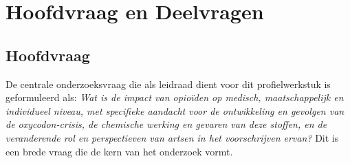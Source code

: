 \documentclass[11pt, a4paper]{report} %
\begin{document}
\section{Hoofdvraag en Deelvragen}
\subsection{Hoofdvraag}
De centrale onderzoeksvraag die als leidraad dient voor dit profielwerkstuk is geformuleerd als:
\textit{Wat is de impact van opioïden op medisch, maatschappelijk en individueel niveau, met specifieke aandacht voor de ontwikkeling en gevolgen van de oxycodon-crisis, de chemische werking en gevaren van deze stoffen, en de veranderende rol en perspectieven van artsen in het voorschrijven ervan?} Dit is een brede vraag die de kern van het onderzoek vormt.
\end{document}
